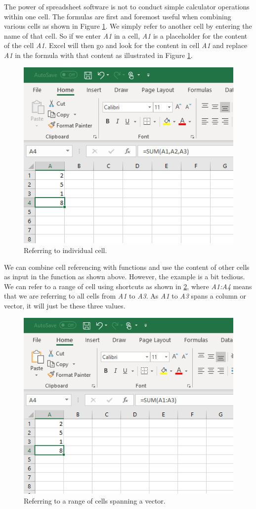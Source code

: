 \documentclass[]{book}
\begin{document}
The power of spreadsheet software is not to conduct simple calculator operations within one cell. The formulas are first and foremost useful when combining various cells as shown in Figure \ref{fig:ex13}. We simply refer to another cell by entering the name of that cell. So if we enter \emph{A1} in a cell, \emph{A1} is a placeholder for the content of the cell \emph{A1}. Excel will then go and look for the content in cell \emph{A1} and replace \emph{A1} in the formula with that content as illustrated in Figure \ref{fig:ex13}.

\begin{figure}

{\centering \includegraphics[width=0.6\linewidth]{_resources/chapter_excelbasic/ref1} 

}

\caption{Referring to individual cell.}\label{fig:ex13}
\end{figure}

We can combine cell referencing with functions and use the content of other cells as input in the function as shown above. However, the example is a bit tedious. We can refer to a range of cell using shortcuts as shown in \ref{fig:ex14}, where \emph{A1:A4} means that we are referring to all cells from \emph{A1} to \emph{A3}. As \emph{A1} to \emph{A3} spans a column or vector, it will just be these three values.

\begin{figure}

{\centering \includegraphics[width=0.6\linewidth]{_resources/chapter_excelbasic/ref2} 

}

\caption{Referring to a range of cells spanning a  vector.}\label{fig:ex14}
\end{figure}
\end{document}

